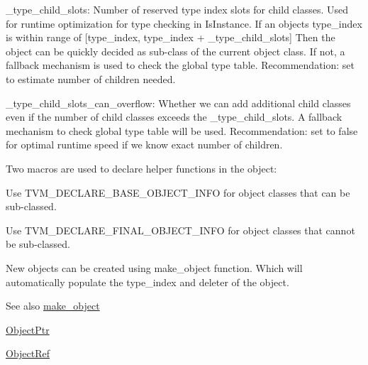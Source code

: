 \begin{DoxyItemize}
\item \+\_\+type\+\_\+child\+\_\+slots\+: Number of reserved type index slots for child classes. Used for runtime optimization for type checking in Is\+Instance. If an object\textquotesingle{}s type\+\_\+index is within range of \mbox{[}type\+\_\+index, type\+\_\+index + \+\_\+type\+\_\+child\+\_\+slots\mbox{]} Then the object can be quickly decided as sub-\/class of the current object class. If not, a fallback mechanism is used to check the global type table. Recommendation\+: set to estimate number of children needed.
\item \+\_\+type\+\_\+child\+\_\+slots\+\_\+can\+\_\+overflow\+: Whether we can add additional child classes even if the number of child classes exceeds the \+\_\+type\+\_\+child\+\_\+slots. A fallback mechanism to check global type table will be used. Recommendation\+: set to false for optimal runtime speed if we know exact number of children.
\end{DoxyItemize}

Two macros are used to declare helper functions in the object\+:
\begin{DoxyItemize}
\item Use T\+V\+M\+\_\+\+D\+E\+C\+L\+A\+R\+E\+\_\+\+B\+A\+S\+E\+\_\+\+O\+B\+J\+E\+C\+T\+\_\+\+I\+N\+FO for object classes that can be sub-\/classed.
\item Use T\+V\+M\+\_\+\+D\+E\+C\+L\+A\+R\+E\+\_\+\+F\+I\+N\+A\+L\+\_\+\+O\+B\+J\+E\+C\+T\+\_\+\+I\+N\+FO for object classes that cannot be sub-\/classed.
\end{DoxyItemize}

New objects can be created using make\+\_\+object function. Which will automatically populate the type\+\_\+index and deleter of the object.

\begin{DoxySeeAlso}{See also}
\hyperlink{namespacetvm_1_1runtime_a93466f4543eedc3925c66ed0e7ef2671}{make\+\_\+object} 

\hyperlink{classtvm_1_1runtime_1_1ObjectPtr}{Object\+Ptr} 

\hyperlink{classtvm_1_1runtime_1_1ObjectRef}{Object\+Ref}
\end{DoxySeeAlso}

